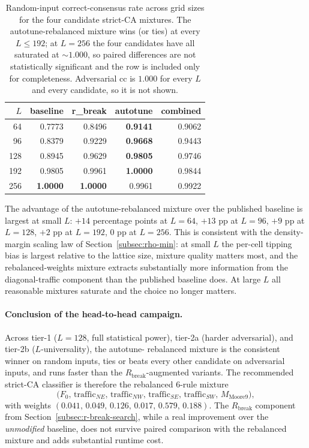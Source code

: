 \documentclass[11pt,a4paper]{article}
\begin{document}
\begin{table}[h]\centering\small
\begin{tabular}{r r r r r}
\toprule
$L$ & baseline & r\_break & autotune & combined \\
\midrule
64  & 0.7773 & 0.8496 & \textbf{0.9141} & 0.9062 \\
96  & 0.8379 & 0.9229 & \textbf{0.9668} & 0.9443 \\
128 & 0.8945 & 0.9629 & \textbf{0.9805} & 0.9746 \\
192 & 0.9805 & 0.9961 & \textbf{1.0000} & 0.9844 \\
256 & \textbf{1.0000} & \textbf{1.0000} & 0.9961 & 0.9922 \\
\bottomrule
\end{tabular}
\caption{Random-input correct-consensus rate across grid sizes for the
four candidate strict-CA mixtures.  The autotune-rebalanced mixture
wins (or ties) at every \(L \leq 192\); at \(L = 256\) the four
candidates have all saturated at \({\sim}\!1.000\), so paired
differences are not statistically significant and the row is
included only for completeness.  Adversarial cc is \(1.000\) for
every \(L\) and every candidate, so it is not shown.}
\label{tab:h2h-tier2b}
\end{table}

The advantage of the autotune-rebalanced mixture over the published
baseline is largest at small \(L\): \(+14\) percentage points at
\(L=64\), \(+13\) pp at \(L=96\), \(+9\) pp at \(L=128\), \(+2\) pp at
\(L=192\), \(0\) pp at \(L=256\).  This is consistent with the
density-margin scaling law of Section~\ref{subsec:rho-min}: at small
\(L\) the per-cell tipping bias is largest relative to the lattice
size, mixture quality matters most, and the rebalanced-weights
mixture extracts substantially more information from the
diagonal-traffic component than the published baseline does.  At
large \(L\) all reasonable mixtures saturate and the choice no
longer matters.

\paragraph{Conclusion of the head-to-head campaign.}
Across tier-1 (\(L=128\), full statistical power), tier-2a (harder
adversarial), and tier-2b (\(L\)-universality), the autotune-
rebalanced mixture is the consistent winner on random inputs, ties
or beats every other candidate on adversarial inputs, and runs
faster than the \(R_{\mathrm{break}}\)-augmented variants.  The
recommended strict-CA classifier is therefore the rebalanced
6-rule mixture
\[
\bigl(F_0,\,\mathrm{traffic}_{NE},\,\mathrm{traffic}_{NW},\,
       \mathrm{traffic}_{SE},\,\mathrm{traffic}_{SW},\,M_{\mathrm{Moore9}}\bigr),
\]
with weights \((0.041,\,0.049,\,0.126,\,0.017,\,0.579,\,0.188)\).
The \(R_{\mathrm{break}}\) component from
Section~\ref{subsec:r-break-search}, while a real improvement over
the \emph{unmodified} baseline, does not survive paired comparison
with the rebalanced mixture and adds substantial runtime cost.
\end{document}
